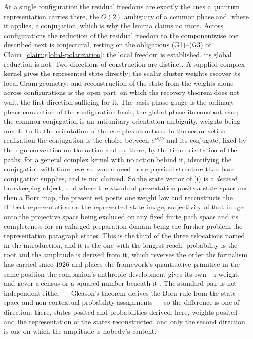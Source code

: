 \noindent At a single configuration the residual freedoms are exactly the ones a quantum representation carries there, the $O(2)$ ambiguity of a common phase and, where it applies, a conjugation, which is why the lemma claims no more. Across configurations the reduction of the residual freedom to the componentwise one described next is conjectural, resting on the obligations (G1)--(G3) of Claim~\ref{claim:global-polarization}: the local freedom is established, its global reduction is not. Two directions of construction are distinct. A supplied complex kernel gives the represented state directly; the scalar cluster weights recover its local Gram geometry; and reconstruction of the state from the weights alone across configurations is the open part, on which the recovery theorem does not wait, the first direction sufficing for it. The basis-phase gauge is the ordinary phase convention of the configuration basis, the global phase its constant case; the common conjugation is an antiunitary orientation ambiguity, weights being unable to fix the orientation of the complex structure. In the scalar-action realization the conjugation is the choice between $e^{iS/\hbar}$ and its conjugate, fixed by the sign convention on the action and so, there, by the time orientation of the paths; for a general complex kernel with no action behind it, identifying the conjugation with time reversal would need more physical structure than bare conjugation supplies, and is not claimed. So the state vector of (i) is a \emph{derived} bookkeeping object, and where the standard presentation posits a state space and then a Born map, the present set posits one weight law and reconstructs the Hilbert representation on the represented state image, surjectivity of that image onto the projective space being excluded on any fixed finite path space and its completeness for an enlarged preparation domain being the further problem the representation paragraph states. This is the third of the three relocations named in the introduction, and it is the one with the longest reach: probability is the root and the amplitude is derived from it, which reverses the order the formalism has carried since 1926 and places the framework's quantitative primitive in the same position the companion's anthropic development gives its own---a weight, and never a census or a squared number beneath it \cite{Aethus}. The standard pair is not independent either --- Gleason's theorem derives the Born rule from the state space and non-contextual probability assignments --- so the difference is one of direction: there, states posited and probabilities derived; here, weights posited and the representation of the states reconstructed, and only the second direction is one on which the amplitude is nobody's content.

